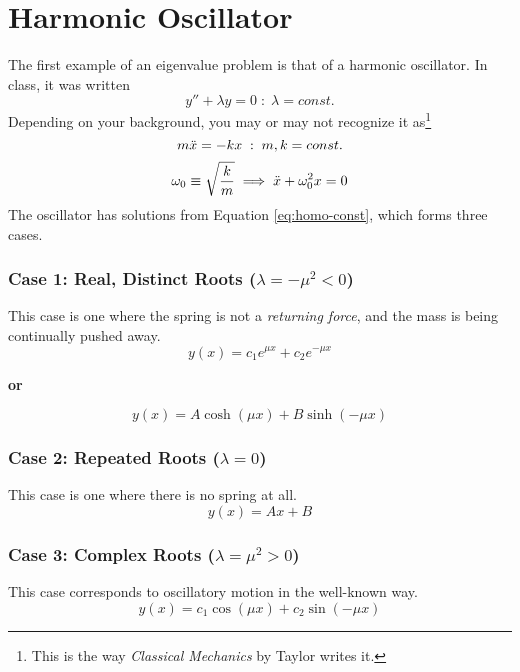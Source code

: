 \section{Harmonic Oscillator}
The first example of an eigenvalue problem is that of a harmonic oscillator. In class, it was written
\begin{equation} \label{eq:harmonic-osc}
    y''+ \lambda y = 0 \; : \; \lambda = const.
\end{equation}
Depending on your background, you may or may not recognize it as\footnote{This is the way \emph{Classical Mechanics} by Taylor writes it.}
\begin{equation*}
    m \Ddot{x} = -k x \; : \; m,k = const.
\end{equation*}
\begin{equation*}
    \omega_0 \equiv \sqrt{\frac{k}{m}} \implies \Ddot{x} + \omega_0^2 x = 0
\end{equation*}
The oscillator has solutions from Equation \ref{eq:homo-const}, which forms three cases.

\subsubsection{Case 1: Real, Distinct Roots ($\lambda = -\mu^2 < 0$)}
This case is one where the spring is not a \emph{returning force}, and the mass is being continually pushed away.
\begin{equation} \label{harmonic-realroots}
    y(x) = c_1 e^{\mu x} + c_2 e^{-\mu x}
\end{equation}
\begin{center}
    \textbf{or}
\end{center}
\begin{equation} \label{harmonic-realroots}
    y(x) = A \cosh{(\mu x)} + B \sinh{(-\mu x)}
\end{equation}

\subsubsection{Case 2: Repeated Roots ($\lambda = 0$)}
This case is one where there is no spring at all.
\begin{equation}
    y(x) = Ax + B
\end{equation}

\subsubsection{Case 3: Complex Roots ($\lambda = \mu^2 > 0$)}
This case corresponds to oscillatory motion in the well-known way.
\begin{equation} \label{harmonic-realroots}
    y(x) = c_1 \cos{(\mu x)} + c_2 \sin{(-\mu x)}
\end{equation}



